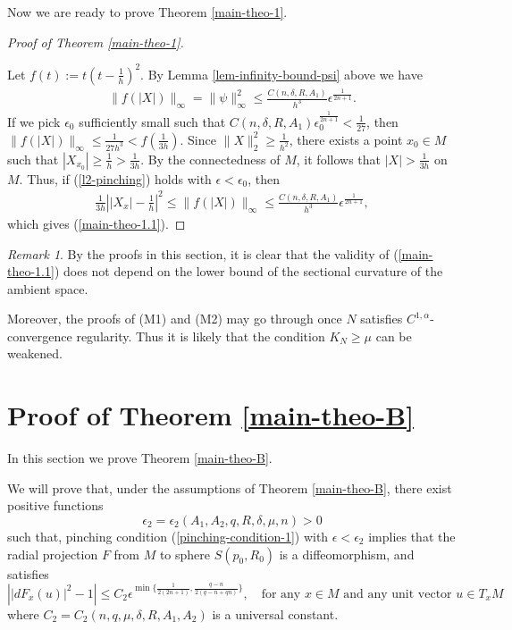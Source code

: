 \documentclass{amsart}
\numberwithin{equation}{section}
\theoremstyle{remark}
\newtheorem{rem}[theo]{Remark}
\renewcommand{\(}{\left(}
\renewcommand{\)}{\right)}
\renewcommand{\~}{\tilde}
\renewcommand{\-}{\overline}
\renewcommand{\d}{\delta}
\newcommand{\e}{\epsilon}
\begin{document}
Now we are ready to prove Theorem \ref{main-theo-1}.
\vspace{2mm}
\begin{proof}[Proof of Theorem \ref{main-theo-1}]
	~
	
	Let $f(t):=t(t-\frac{1}{h})^2$. By Lemma \ref{lem-infinity-bound-psi} above we have
	\begin{align*}
	\|f(|X|)\|_\infty=\|\psi\|_\infty^2 \leq \frac{C(n,\d,R,A_1)}{h^3}\e^\frac{1}{2n+1}.
	\end{align*}
	If we pick $\e_0$ sufficiently small such that $C(n,\d,R,A_1)\e_0^\frac{1}{2n+1}<\frac{1}{27}$, then $\|f(|X|)\|_\infty\leq \frac{1}{27h^3}<f(\frac{1}{3h})$. Since $\|X\|_2^2 \geq \frac{1}{h^2}$, there exists a point $x_0\in M$ such that $|X_{x_0}|\geq \frac{1}{h}>\frac{1}{3h}$. By the connectedness of $M$, it follows that $|X|>\frac{1}{3h}$ on $M$. Thus, if (\ref{l2-pinching}) holds with $\e<\e_0$, then
	\begin{align*}
	\frac{1}{3h} \left| |X_x|-\frac{1}{h} \right|^2 \leq \|f(|X|)\|_\infty\leq \frac{C(n,\d,R,A_1)}{h^3}\e^\frac{1}{2n+1},
	\end{align*}
	which gives (\ref{main-theo-1.1}).
\end{proof}

\begin{rem}\label{rem-fixed-position}
	By the proofs in this section, it is clear that the validity of (\ref{main-theo-1.1}) does not depend on the lower bound of the sectional curvature of the ambient space.
	
	Moreover, the proofs of (M1) and (M2) may go through once $N$ satisfies $C^{1,\alpha}$-convergence regularity. Thus it is likely that the condition $K_N\ge \mu$ can be weakened.
\end{rem}

\section{Proof of Theorem \ref{main-theo-B}}
\label{sec:5}

In this section we prove Theorem \ref{main-theo-B}.

We will prove that, under the assumptions of Theorem \ref{main-theo-B}, there exist positive functions $$\e_2=\e_2(A_1,A_2,q,R,\d,\mu,n)>0$$ such that, pinching condition (\ref{pinching-condition-1}) with $\e<\e_2$ implies that the radial projection $F$ from $M$ to sphere $S(p_0,R_0)$ is a diffeomorphism, and satisfies
\begin{equation}\label{ineq-almost-isom}
\left| |dF_x(u)|^2-1 \right|\leq C_2\e^{\min\{ \frac{1}{2(2n+1)},\frac{q-n}{2(q-n+qn)}\}}, \quad \text{for any $x\in M$ and any unit vector $u\in T_x M$}
\end{equation}
where $C_2=C_2(n,q,\mu,\d,R,A_1,A_2)$ is a universal constant.
\end{document}
